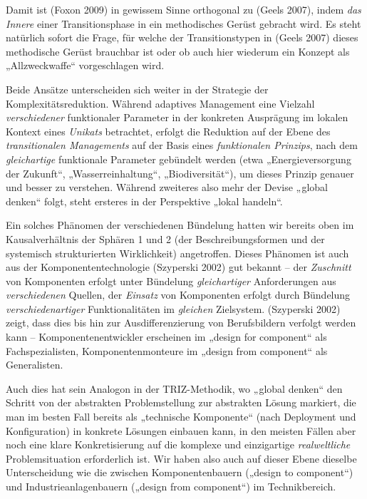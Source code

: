 \documentclass[11pt,a4paper]{article}
\begin{document}
Damit ist (Foxon 2009) in gewissem Sinne orthogonal zu (Geels 2007), indem
\emph{das Innere} einer Transitionsphase in ein methodisches Gerüst gebracht
wird. Es steht natürlich sofort die Frage, für welche der Transitionstypen in
(Geels 2007) dieses methodische Gerüst brauchbar ist oder ob auch hier
wiederum ein Konzept als „Allzweckwaffe“ vorgeschlagen wird.

Beide Ansätze unterscheiden sich weiter in der Strategie der
Komplexitätsreduktion.  Während adaptives Management eine Vielzahl
\emph{verschiedener} funktionaler Parameter in der konkreten Ausprägung im
lokalen Kontext eines \emph{Unikats} betrachtet, erfolgt die Reduktion auf der
Ebene des \emph{transitionalen Managements} auf der Basis eines
\emph{funktionalen Prinzips}, nach dem \emph{gleichartige} funktionale
Parameter gebündelt werden (etwa „Energieversorgung der Zukunft“,
„Wasserreinhaltung“, „Biodiversität“), um dieses Prinzip genauer und besser zu
verstehen. Während zweiteres also mehr der Devise „global denken“ folgt, steht
ersteres in der Perspektive „lokal handeln“.

Ein solches Phänomen der verschiedenen Bündelung hatten wir bereits oben im
Kausalverhältnis der Sphären 1 und 2 (der Beschreibungsformen und der
systemisch strukturierten Wirklichkeit) angetroffen. Dieses Phänomen ist auch
aus der Komponententechnologie (Szyperski 2002) gut bekannt -- der
\emph{Zuschnitt} von Komponenten erfolgt unter Bündelung \emph{gleichartiger}
Anforderungen aus \emph{verschiedenen} Quellen, der \emph{Einsatz} von
Komponenten erfolgt durch Bündelung \emph{verschiedenartiger} Funktionalitäten
im \emph{gleichen} Zielsystem. (Szyperski 2002) zeigt, dass dies bis hin zur
Ausdifferenzierung von Berufsbildern verfolgt werden kann --
Komponentenentwickler erscheinen im „design for component“ als
Fachspezialisten, Komponentenmonteure im „design from component“ als
Generalisten.

Auch dies hat sein Analogon in der TRIZ-Methodik, wo „global denken“ den
Schritt von der abstrakten Problemstellung zur abstrakten Lösung markiert, die
man im besten Fall bereits als „technische Komponente“ (nach Deployment und
Konfiguration) in konkrete Lösungen einbauen kann, in den meisten Fällen aber
noch eine klare Konkretisierung auf die komplexe und einzigartige
\emph{realweltliche} Problemsituation erforderlich ist. Wir haben also auch
auf dieser Ebene dieselbe Unterscheidung wie die zwischen Komponentenbauern
(„design to component“) und Industrieanlagenbauern („design from component“)
im Technikbereich.
\end{document}
